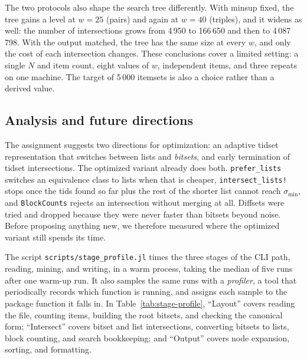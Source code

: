 The two protocols also shape the search tree differently. With minsup fixed, the tree
gains a level at $w = 25$ (pairs) and again at $w = 40$ (triples), and it widens as well:
the number of intersections grows from 4\,950 to 166\,650 and then to 4\,087\,798. With the
output matched, the tree has the same size at every $w$, and only the cost of each
intersection changes. These conclusions cover a limited setting: a single $N$ and item
count, eight values of $w$, independent items, and three repeats on one machine. The
target of 5\,000 itemsets is also a choice rather than a derived value.

\subsection{Analysis and future directions}
\label{sec:future}
The assignment suggests two directions for optimization: an adaptive tidset
representation that switches between lists and \emph{bitsets}, and early termination of
tidset intersections. The optimized variant already does both. \texttt{prefer\_lists}
switches an equivalence class to lists when that is cheaper, \texttt{intersect\_lists!}
stops once the tids found so far plus the rest of the shorter list cannot reach
$\sigma_{\min}$, and \texttt{BlockCounts} rejects an intersection without merging at all.
Diffsets were tried and dropped because they were never faster than bitsets beyond noise.
Before proposing anything new, we therefore measured where the optimized variant still
spends its time.

The script \texttt{scripts/stage\_profile.jl} times the three stages of the CLI path,
reading, mining, and writing, in a warm process, taking the median of five runs after one
warm-up run. It also samples the same runs with a \emph{profiler}, a tool that
periodically records which function is running, and assigns each sample to the package
function it falls in. In Table~\ref{tab:stage-profile}, ``Layout'' covers reading the
file, counting items, building the root bitsets, and checking the canonical form;
``Intersect'' covers bitset and list intersections, converting bitsets to lists, block
counting, and search bookkeeping; and ``Output'' covers node expansion, sorting, and
formatting.

